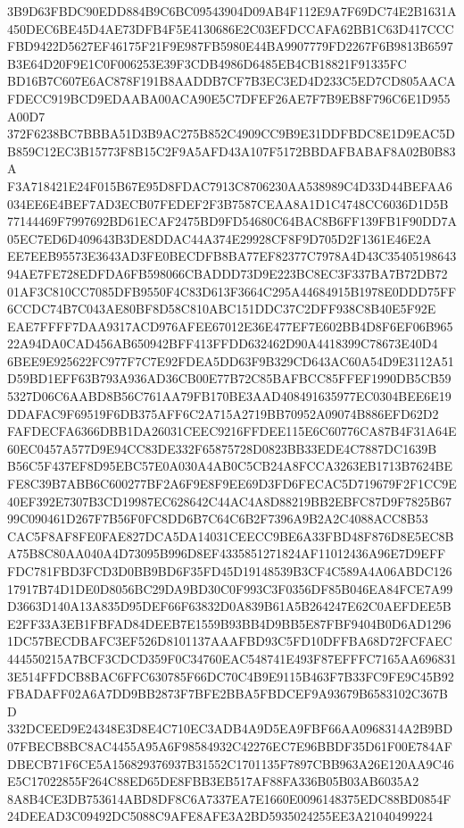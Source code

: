 \documentclass[UTF8,fontset=fandol,zihao=-4,a4paper]{ctexart}
\begin{document}
{{3B9D63FBDC90EDD884B9C6BC09543904D09AB4F112E9A7F69DC74E2B1631A450DEC6BE45D4AE73DFB4F5E4130686E2C03EFDCCAFA62BB1C63D417CCC
FBD9422D5627EF46175F21F9E987FB5980E44BA9907779FD2267F6B9813B6597B3E64D20F9E1C0F006253E39F3CDB4986D6485EB4CB18821F91335FC
BD16B7C607E6AC878F191B8AADDB7CF7B3EC3ED4D233C5ED7CD805AACAFDECC919BCD9EDAABA00ACA90E5C7DFEF26AE7F7B9EB8F796C6E1D955A00D7
372F6238BC7BBBA51D3B9AC275B852C4909CC9B9E31DDFBDC8E1D9EAC5DB859C12EC3B15773F8B15C2F9A5AFD43A107F5172BBDAFBABAF8A02B0B83A
F3A718421E24F015B67E95D8FDAC7913C8706230AA538989C4D33D44BEFAA6034EE6E4BEF7AD3ECB07FEDEF2F3B7587CEAA8A1D1C4748CC6036D1D5B
77144469F7997692BD61ECAF2475BD9FD54680C64BAC8B6FF139FB1F90DD7A05EC7ED6D409643B3DE8DDAC44A374E29928CF8F9D705D2F1361E46E2A
EE7EEB95573E3643AD3FE0BECDFB8BA77EF82377C7978A4D43C3540519864394AE7FE728EDFDA6FB598066CBADDD73D9E223BC8EC3F337BA7B72DB72
01AF3C810CC7085DFB9550F4C83D613F3664C295A44684915B1978E0DDD75FF6CCDC74B7C043AE80BF8D58C810ABC151DDC37C2DFF938C8B40E5F92E
EAE7FFFF7DAA9317ACD976AFEE67012E36E477EF7E602BB4D8F6EF06B96522A94DA0CAD456AB650942BFF413FFDD632462D90A4418399C78673E40D4
6BEE9E925622FC977F7C7E92FDEA5DD63F9B329CD643AC60A54D9E3112A51D59BD1EFF63B793A936AD36CB00E77B72C85BAFBCC85FFEF1990DB5CB59
5327D06C6AABD8B56C761AA79FB170BE3AAD408491635977EC0304BEE6E19DDAFAC9F69519F6DB375AFF6C2A715A2719BB70952A09074B886EFD62D2
FAFDECFA6366DBB1DA26031CEEC9216FFDEE115E6C60776CA87B4F31A64E60EC0457A577D9E94CC83DE332F65875728D0823BB33EDE4C7887DC1639B
B56C5F437EF8D95EBC57E0A030A4AB0C5CB24A8FCCA3263EB1713B7624BEFE8C39B7ABB6C600277BF2A6F9E8F9EE69D3FD6FECAC5D719679F2F1CC9E
40EF392E7307B3CD19987EC628642C44AC4A8D88219BB2EBFC87D9F7825B6799C090461D267F7B56F0FC8DD6B7C64C6B2F7396A9B2A2C4088ACC8B53
CAC5F8AF8FE0FAE827DCA5DA14031CEECC9BE6A33FBD48F876D8E5EC8BA75B8C80AA040A4D73095B996D8EF4335851271824AF11012436A96E7D9EFF
FDC781FBD3FCD3D0BB9BD6F35FD45D19148539B3CF4C589A4A06ABDC12617917B74D1DE0D8056BC29DA9BD30C0F993C3F0356DF85B046EA84FCE7A99
D3663D140A13A835D95DEF66F63832D0A839B61A5B264247E62C0AEFDEE5BE2FF33A3EB1FBFAD84DEEB7E1559B93BB4D9BB5E87FBF9404B0D6AD1296
1DC57BECDBAFC3EF526D8101137AAAFBD93C5FD10DFFBA68D72FCFAEC444550215A7BCF3CDCD359F0C34760EAC548741E493F87EFFFC7165AA696831
3E514FFDCB8BAC6FFC630785F66DC70C4B9E9115B463F7B33FC9FE9C45B92FBADAFF02A6A7DD9BB2873F7BFE2BBA5FBDCEF9A93679B6583102C367BD
332DCEED9E24348E3D8E4C710EC3ADB4A9D5EA9FBF66AA0968314A2B9BD07FBECB8BC8AC4455A95A6F98584932C42276EC7E96BBDF35D61F00E784AF
DBECB71F6CE5A156829376937B31552C1701135F7897CBB963A26E120AA9C46E5C17022855F264C88ED65DE8FBB3EB517AF88FA336B05B03AB6035A2
8A8B4CE3DB753614ABD8DF8C6A7337EA7E1660E0096148375EDC88BD0854F24DEEAD3C09492DC5088C9AFE8AFE3A2BD5935024255EE3A21040499224
}}
\end{document}
